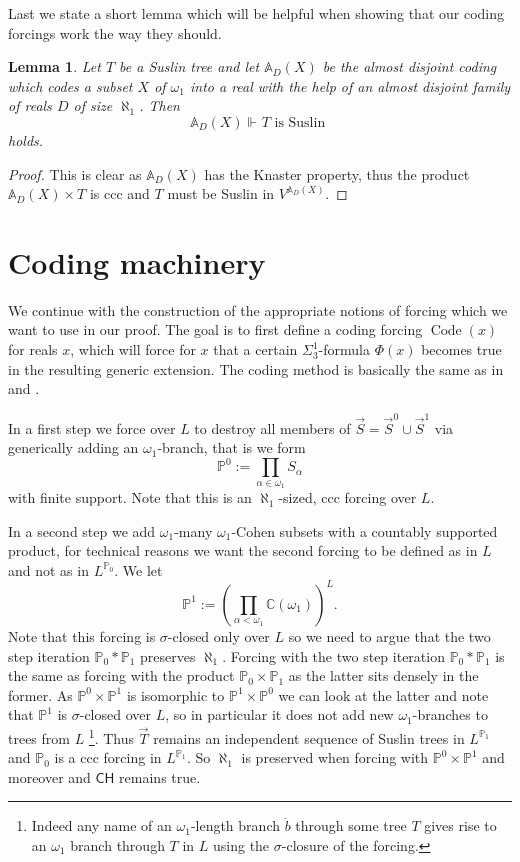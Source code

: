 \documentclass[a4paper,11pt]{article}
\newtheorem{lemma}[theorem]{Lemma}
\newcommand{\forceP}{\mathbb{P}}
\newcommand{\CH}{\mathsf{CH}}
\begin{document}
Last we state a short lemma which will be helpful when showing that our coding forcings work the way they should.
\begin{lemma}\label{a.d.coding preserves Suslin trees}
 Let $T$ be a Suslin tree and let $\mathbb{A}_D(X)$ be the almost disjoint coding which codes
 a subset $X$ of $\omega_1$ into a real with the help of an almost disjoint family
 of reals $D$ of size $\aleph_1$. Then $$\mathbb{A}_{D}(X) \Vdash_{} T \text{ is Suslin }$$
 holds.
\end{lemma}
\begin{proof}
 This is clear as $\mathbb{A}_{D}(X)$ has the Knaster property, thus the product $\mathbb{A}_{D}(X) \times T$ is ccc and $T$ must be Suslin in $V^{\mathbb{A}_{D}(X)}$. 
\end{proof}








\section{Coding machinery}
We continue with the construction of the appropriate notions of forcing which we want to use in our proof. The goal is to first define a coding forcing $\operatorname{Code} (x)$ for reals $x$, which will force for $x$ that a certain $\Sigma^1_3$-formula $\Phi(x)$ becomes true in the resulting generic extension. The coding method is basically the same as in \cite{Ho2} and \cite{Ho3}.

In a first step we force over $L$ to destroy all members of $\vec{S}= \vec{S}^0 \cup \vec{S}^1$ via generically adding an $\omega_1$-branch, that is we  form \[\forceP^0:=\prod_{\alpha \in \omega_1} S_{\alpha}\] with finite support. Note that this is an $\aleph_1$-sized, ccc forcing over $L$.

In a second step
we add $\omega_1$-many $\omega_1$-Cohen subsets with a countably supported product, for technical reasons we want the second forcing to be defined as in $L$ and not as in $L^{\forceP_0}$. We let $$\forceP^1:= (\prod_{\alpha< \omega_1} \mathbb{C} (\omega_1))^L.$$
Note that this forcing is  $\sigma$-closed only over $L$ so we need to argue that the two step iteration $\forceP_0 \ast \forceP_1$ preserves $\aleph_1$. Forcing with the two step iteration $\forceP_0 \ast \forceP_1$ is the same as forcing with the product $\forceP_0 \times \forceP_1$ as the latter sits densely in the former. As $\forceP^0 \times \forceP^1$ is isomorphic to $\forceP^1 \times \forceP^0$ we can look at the latter and note that $\forceP^1$ is $\sigma$-closed over $L$, so in particular it does not add new $\omega_1$-branches to trees from $L$ \footnote{Indeed any name of an $\omega_1$-length branch $\dot{b}$ through some tree $T$ gives rise to an $\omega_1$ branch through $T$ in $L$ using the $\sigma$-closure of the forcing.}. Thus $\vec{T}$ remains an independent sequence of Suslin trees in $L^{\forceP_1}$ and $\forceP_0$ is a ccc forcing in $L^{\forceP_1}$. So $\aleph_1$ is preserved when forcing with $\forceP^0 \times \forceP^1$ and moreover and $\CH$ remains true.  
\end{document}
